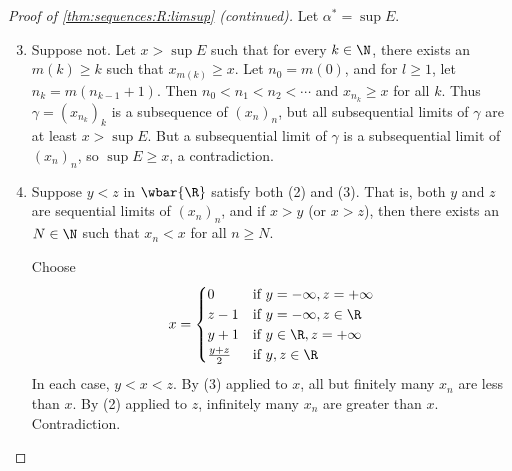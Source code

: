 \begin{proof}[Proof of \cref{thm:sequences:R:limsup} (continued)]
    Let $\alpha^* = \sup E$.
    \begin{enumerate}[label=\textbf{(\arabic*)}]
        \setcounter{enumi}{2}
        \item Suppose not.
        Let $x > \sup E$ such that for every $k \in \N$,
        there exists an $m(k) \ge k$ such that $x_{m(k)} \ge x$.
        Let $n_0 = m(0)$, and for $l \ge 1$, let $n_k = m(n_{k-1} + 1)$.
        Then $n_0 < n_1 < n_2 < \cdots$ and $x_{n_k} \ge x$ for all $k$.
        Thus $\gamma = (x_{n_k})_k$ is a subsequence of $(x_n)_n$, but all
        subsequential limits of $\gamma$ are at least $x > \sup E$.
        But a subsequential limit of $\gamma$ is a subsequential limit of
        $(x_n)_n$, so $\sup E \ge x$, a contradiction.
        \item Suppose $y < z$ in $\wbar{\R}$ satisfy both (2) and (3).
        That is, both $y$ and $z$ are sequential limits of $(x_n)_n$,
        and if $x > y$ (or $x > z$), then there exists an $N \in \N$ such
        that $x_n < x$ for all $n \ge N$.

        Choose \[
            x = \begin{cases}
                0 & \text{if } y = -\infty, z = +\infty \\
                z - 1 & \text{if } y = -\infty, z \in \R \\
                y + 1 & \text{if } y \in \R, z = +\infty \\
                \frac{y + z}{2} & \text{if } y, z \in \R
            \end{cases}
        \] In each case, $y < x < z$.
        By (3) applied to $x$, all but finitely many $x_n$ are less than
        $x$.
        By (2) applied to $z$, infinitely many $x_n$ are greater than $x$.
        Contradiction.
    \end{enumerate}
\end{proof}

